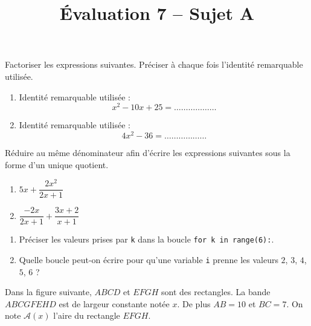 \documentclass[a4paper,dvipsnames]{article}
\begin{document}
\title{Évaluation 7 -- Sujet A}
\author{}
\date{}

\maketitle{}

\pagestyle{empty}
\thispagestyle{empty}

\exo[3 points] Factoriser les expressions suivantes. Préciser à chaque fois l'identité remarquable utilisée.
\begin{enumerate}
  \item Identité remarquable utilisée : \dotfill\\
    \[x^2-10x+25=\hdots\hdots\hdots\hdots\hdots\hdots\]
  \item Identité remarquable utilisée : \dotfill\\
    \[4x^2-36=\hdots\hdots\hdots\hdots\hdots\hdots\]
\end{enumerate}

\bigskip

\exo[3 points] Réduire au même dénominateur afin d'écrire les expressions suivantes sous la forme d'un unique quotient.
\begin{multicols}{2}
  \begin{enumerate}
    \item $5x+\dfrac{2x^2}{2x+1}$
    \item $\dfrac{-2x}{2x+1}+\dfrac{3x+2}{x+1}$
  \end{enumerate}
\end{multicols}
\dotfill{}

\bigskip

\exo[2 points] \vspace{-2mm}
\begin{enumerate}
  \item Préciser les valeurs prises par \texttt{k} dans la boucle \texttt{for k in range(6):}.
  \item Quelle boucle peut-on écrire pour qu'une variable \texttt{i} prenne les valeurs $2$, $3$, $4$, $5$, $6$ ?
\end{enumerate}

\pagebreak

\exo[4 points] Dans la figure suivante, $ABCD$ et $EFGH$ sont des rectangles. La \og{}bande\fg{} $ABCGFEHD$ est de largeur constante notée $x$. De plus $AB=10$ et $BC=7$. On note $\mathcal{A}(x)$ l'aire du rectangle $EFGH$.
\end{document}
